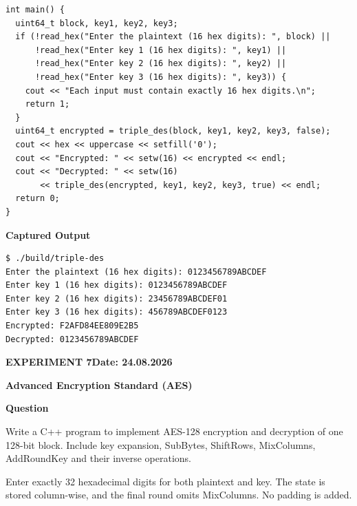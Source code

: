 \documentclass[11pt,a4paper]{article}
\newcommand{\blocktitle}[1]{\Needspace{6\baselineskip}\par\textbf{#1}\par}
\begin{document}
\begin{lstlisting}[style=cpp]
int main() {
  uint64_t block, key1, key2, key3;
  if (!read_hex("Enter the plaintext (16 hex digits): ", block) ||
      !read_hex("Enter key 1 (16 hex digits): ", key1) ||
      !read_hex("Enter key 2 (16 hex digits): ", key2) ||
      !read_hex("Enter key 3 (16 hex digits): ", key3)) {
    cout << "Each input must contain exactly 16 hex digits.\n";
    return 1;
  }
  uint64_t encrypted = triple_des(block, key1, key2, key3, false);
  cout << hex << uppercase << setfill('0');
  cout << "Encrypted: " << setw(16) << encrypted << endl;
  cout << "Decrypted: " << setw(16)
       << triple_des(encrypted, key1, key2, key3, true) << endl;
  return 0;
}
\end{lstlisting}
\par\begin{minipage}{\linewidth}
\textbf{Captured Output}\par
\begin{lstlisting}[style=terminal]
$ ./build/triple-des
Enter the plaintext (16 hex digits): 0123456789ABCDEF
Enter key 1 (16 hex digits): 0123456789ABCDEF
Enter key 2 (16 hex digits): 23456789ABCDEF01
Enter key 3 (16 hex digits): 456789ABCDEF0123
Encrypted: F2AFD84EE809E2B5
Decrypted: 0123456789ABCDEF
\end{lstlisting}
\end{minipage}

\clearpage
{}\label{exp:aes}
{\small\bfseries EXPERIMENT 7\hfill Date: 24.08.2026\par}
{\Large\bfseries Advanced Encryption Standard (AES)\par}
\vspace{2mm}
\blocktitle{Question}
Write a C++ program to implement AES-128 encryption and decryption of one 128-bit block. Include key expansion, SubBytes, ShiftRows, MixColumns, AddRoundKey and their inverse operations.

Enter exactly 32 hexadecimal digits for both plaintext and key. The state is stored column-wise, and the final round omits MixColumns. No padding is added.
\end{document}
